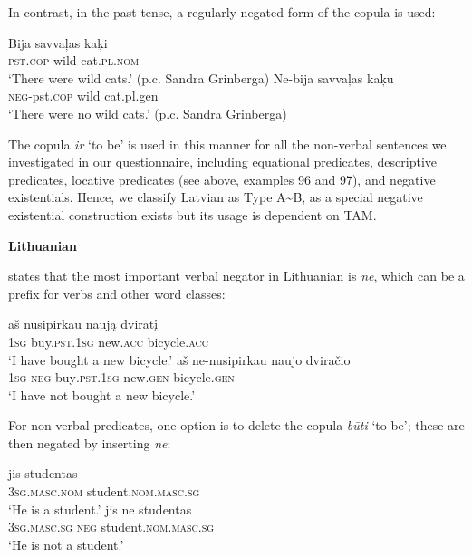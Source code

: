 ﻿\documentclass[output=paper]{langsci/langscibook}
\begin{document}
\begin{unindented}
In contrast, in the past tense, a regularly negated form of the copula is used:
%
\begin{exe}\ex \begin{xlist}
\ex\gll Bija savvaļas kaķi \\
\textsc{pst.cop} wild cat.\textsc{pl.nom} \\
    \glt `There were wild cats.' (p.c. Sandra Grinberga)
\ex\gll Ne-bija savvaļas kaķu\\
\textsc{neg}-pst.\textsc{cop} wild cat.pl.gen\\
\glt `There were no wild cats.' (p.c. Sandra Grinberga)
    \end{xlist}\end{exe}

The copula \textit{ir} `to be' is used in this manner for all the non-verbal sentences we investigated in our questionnaire, including equational predicates, descriptive predicates, locative predicates (see above, examples 96 and 97), and negative existentials. Hence, we classify Latvian as Type A{\textasciitilde}B, as a special negative existential construction exists but its usage is dependent on TAM. 

\textbf{Lithuanian}

\citet[176--177]{Mathiassen1996} states that the most important verbal negator in Lithuanian is \textit{ne}, which can be a prefix for verbs and other word classes:
%
\begin{exe}\ex \gll aš nusipirkau naują dviratį \\
\textsc{1sg} buy.\textsc{pst.1sg} new.\textsc{acc} bicycle.\textsc{acc} \\
    \glt `I have bought a new bicycle.' \citep[185]{Mathiassen1996}
\ex \gll aš ne-nusipirkau naujo dviračio \\
\textsc{1sg} \textsc{neg}-buy\textsc{.pst.1sg} new.\textsc{gen} bicycle.\textsc{gen} \\
    \glt `I have not bought a new bicycle.' \citep[185]{Mathiassen1996}
    \end{exe}

For non-verbal predicates, one option is to delete the copula \textit{būti} `to be'; these are then negated by inserting \textit{ne}:
%
\begin{exe}\ex \gll jis studentas \\
\textsc{3sg.masc.nom} student.\textsc{nom.masc.sg} \\
    \glt `He is a student.' \citep[176]{Mathiassen1996}
\ex \gll jis ne studentas \\
\textsc{3sg.masc.sg} \textsc{neg}  student.\textsc{nom.masc.sg} \\
    \glt `He is not a student.' \citep[176]{Mathiassen1996}
    \end{exe}


\end{unindented}
\end{document}

